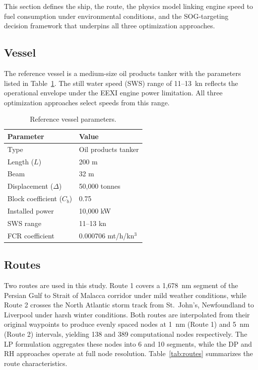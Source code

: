 \documentclass[review]{elsarticle}
\begin{document}
This section defines the ship, the route, the physics model linking engine speed to fuel consumption under environmental conditions, and the SOG-targeting decision framework that underpins all three optimization approaches.

\subsection{Vessel}
\label{sec:vessel}

The reference vessel is a medium-size oil products tanker with the parameters listed in Table~\ref{tab:ship}. The still water speed (SWS) range of 11--13~kn reflects the operational envelope under the EEXI engine power limitation. All three optimization approaches select speeds from this range.

\begin{table}[htbp]
\centering
\caption{Reference vessel parameters.}
\label{tab:ship}
\begin{tabular}{ll}
\toprule
Parameter & Value \\
\midrule
Type & Oil products tanker \\
Length ($L$) & 200 m \\
Beam & 32 m \\
Displacement ($\Delta$) & 50,000 tonnes \\
Block coefficient ($C_b$) & 0.75 \\
Installed power & 10,000 kW \\
SWS range & 11--13 kn \\
FCR coefficient & 0.000706 mt/h/kn$^3$ \\
\bottomrule
\end{tabular}
\end{table}

\subsection{Routes}
\label{sec:routes}

Two routes are used in this study. Route 1 covers a 1,678~nm segment of the Persian Gulf to Strait of Malacca corridor under mild weather conditions, while Route 2 crosses the North Atlantic storm track from St.\ John's, Newfoundland to Liverpool under harsh winter conditions. Both routes are interpolated from their original waypoints to produce evenly spaced nodes at 1~nm (Route 1) and 5~nm (Route 2) intervals, yielding 138 and 389 computational nodes respectively. The LP formulation aggregates these nodes into 6 and 10 segments, while the DP and RH approaches operate at full node resolution. Table~\ref{tab:routes} summarizes the route characteristics.
\end{document}
